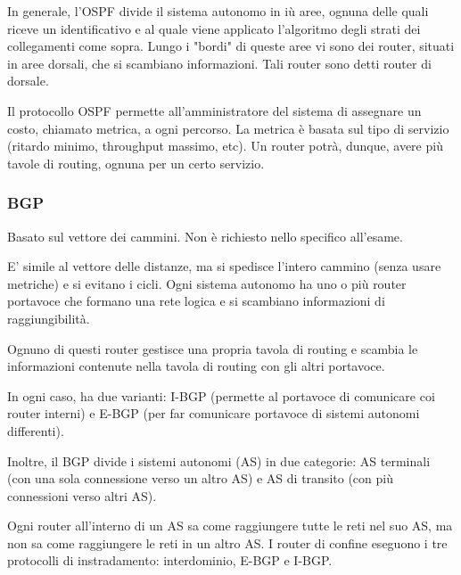             In generale, l'OSPF divide il sistema autonomo in iù aree, ognuna delle quali riceve un identificativo e al quale viene applicato l'algoritmo degli strati dei collegamenti come sopra. Lungo i "bordi" di queste aree vi sono dei router, situati in aree dorsali, che si scambiano informazioni. Tali router sono detti router di dorsale.
            
            Il protocollo OSPF permette all'amministratore del sistema di assegnare un costo, chiamato metrica, a ogni percorso. La metrica è basata sul tipo di servizio (ritardo minimo, throughput massimo, etc). Un router potrà, dunque, avere più tavole di routing, ognuna per un certo servizio.
        
        \subsubsection{BGP}
            
            Basato sul vettore dei cammini. Non è richiesto nello specifico all'esame.
            
            \vspace{3mm}
            
            E' simile al vettore delle distanze, ma si spedisce l'intero cammino (senza usare metriche) e si evitano i cicli. Ogni sistema autonomo ha uno o più router portavoce che formano una rete logica e si scambiano informazioni di raggiungibilità. 
            
            Ognuno di questi router gestisce una propria tavola di routing e scambia le informazioni contenute nella tavola di routing con gli altri portavoce.
            
            \vspace{3mm}
            
            In ogni caso, ha due varianti: I-BGP (permette al portavoce di comunicare coi router interni) e E-BGP (per far comunicare portavoce di sistemi autonomi differenti).
            
            Inoltre, il BGP divide i sistemi autonomi (AS) in due categorie: AS terminali (con una sola connessione verso un altro AS) e AS di transito (con più connessioni verso altri AS).
            
            \vspace{3mm}
            
            Ogni router all'interno di un AS sa come raggiungere tutte le reti nel suo AS, ma non sa come raggiungere le reti in un altro AS. I router di confine eseguono i tre protocolli di instradamento: interdominio, E-BGP e I-BGP.